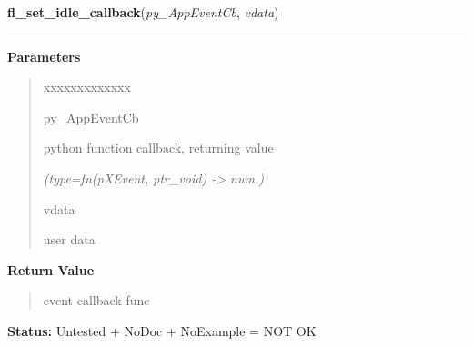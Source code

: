     \vspace{0.5ex}

\hspace{.8\funcindent}\begin{boxedminipage}{\funcwidth}

    \raggedright \textbf{fl\_set\_idle\_callback}(\textit{py\_AppEventCb}, \textit{vdata})

    \vspace{-1.5ex}

    \rule{\textwidth}{0.5\fboxrule}
\setlength{\parskip}{2ex}
\setlength{\parskip}{1ex}
      \textbf{Parameters}
      \vspace{-1ex}

      \begin{quote}
        \begin{Ventry}{xxxxxxxxxxxxx}

          \item[py\_AppEventCb]

          python function callback, returning value

            {\it (type=fn(pXEvent, ptr\_void) -{\textgreater} num.)}

          \item[vdata]

          user data

        \end{Ventry}

      \end{quote}

      \textbf{Return Value}
    \vspace{-1ex}

      \begin{quote}
      event callback func

      \end{quote}

\textbf{Status:} Untested + NoDoc + NoExample = NOT OK



    \end{boxedminipage}

    \label{xformslib:library:fl_addto_selected_xevent}

    \vspace{0.5ex}

